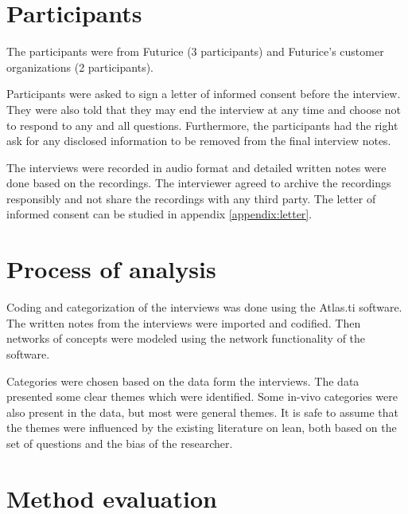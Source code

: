 
\section{Participants}
\label{section:methodparticipants}

The participants were from Futurice (3 participants) and Futurice's customer organizations (2 participants).

Participants were asked to sign a letter of informed consent before the interview. They were also told that they may end the interview at any time and choose not to respond to any and all questions. Furthermore, the participants had the right ask for any disclosed information to be removed from the final interview notes.

The interviews were recorded in audio format and detailed written notes were done based on the recordings. The interviewer agreed to archive the recordings responsibly and not share the recordings with any third party. The letter of informed consent can be studied in appendix \ref{appendix:letter}.


\section{Process of analysis}
\label{section:methodprocess}


Coding and categorization of the interviews was done using the Atlas.ti software. The written notes from the interviews were imported and codified. Then networks of concepts were modeled using the network functionality of the software.

Categories were chosen based on the data form the interviews. The data presented some clear themes which were identified. Some in-vivo categories were also present in the data, but most were general themes. It is safe to assume that the themes were influenced by the existing literature on lean, both based on the set of questions and the bias of the researcher.


\section{Method evaluation}
\label{section:methodevaluation}

